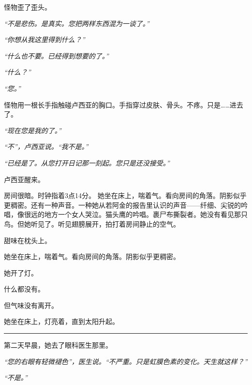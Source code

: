 \noindent 怪物歪了歪头。

\noindent \textit{\textquotedblleft{}不是悲伤。是真实。您把两样东西混为一谈了。\textquotedblright{}}

\noindent \textit{\textquotedblleft{}你想从我这里得到什么？\textquotedblright{}}

\noindent \textit{\textquotedblleft{}什么也不要。已经得到想要的了。\textquotedblright{}}

\noindent \textit{\textquotedblleft{}什么？\textquotedblright{}}

\noindent \textit{\textquotedblleft{}您。\textquotedblright{}}

\noindent 怪物用一根长手指触碰卢西亚的胸口。手指穿过皮肤、骨头。不疼。只是……进去了。

\noindent \textit{\textquotedblleft{}现在您是我的了。\textquotedblright{}}

\noindent \textit{\textquotedblleft{}不\textquotedblright{}，卢西亚说。\textquotedblleft{}我不是。\textquotedblright{}}

\noindent \textit{\textquotedblleft{}已经是了。从您打开日记那一刻起。您只是还没接受。\textquotedblright{}}

\noindent 卢西亚醒来。

\noindent 房间很暗。时钟指着3点14分。
\noindent 她坐在床上，喘着气。看向房间的角落。阴影似乎更稠密。还有一种声音。一种她从若阿金的报告里认识的声音——纤细、尖锐的吟唱，像很远的地方一个女人哭泣。猫头鹰的吟唱。裹尸布撕裂者。她没有看见那只鸟。但她听见了。听见翅膀展开，拍打着房间静止的空气。

\noindent 甜味在枕头上。

\noindent 她坐在床上，喘着气。看向房间的角落。阴影似乎更稠密。

\noindent 她开了灯。

\noindent 什么都没有。

\noindent 但气味没有离开。

\noindent 她坐在床上，灯亮着，直到太阳升起。

\vspace{0.5em}\noindent\rule{\textwidth}{0.5pt}\vspace{0.5em}

\noindent 第二天早晨，她去了眼科医生那里。

\noindent \textit{\textquotedblleft{}您的右眼有轻微褪色\textquotedblright{}，医生说。\textquotedblleft{}不严重。只是虹膜色素的变化。天生就这样？\textquotedblright{}}

\noindent \textit{\textquotedblleft{}不是。\textquotedblright{}}


